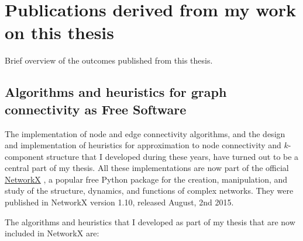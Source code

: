 \chapter{Publications derived from my work on this thesis}
\label{publications}

Brief overview of the outcomes published from this thesis.

\section{Algorithms and heuristics for graph connectivity as Free Software}

The implementation of node and edge connectivity algorithms, and the design and implementation of heuristics for approximation to node connectivity and $k$-component structure that I developed during these years, have turned out to be a central part of my thesis. All these implementations are now part of the official \href{https://networkx.github.io/}{NetworkX} \citep{hagberg:2008}, a popular free Python package for the creation, manipulation, and study of the structure, dynamics, and functions of complex networks. They were published in NetworkX version 1.10, released August, 2nd 2015.

The algorithms and heuristics that I developed as part of my thesis that are now included in NetworkX are: 

